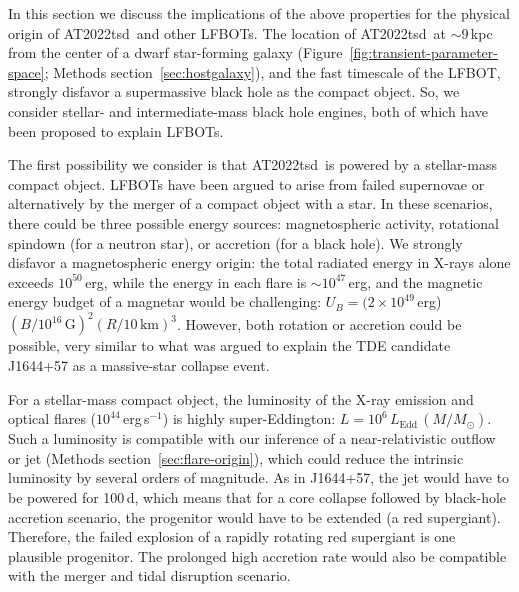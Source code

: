 \documentclass{nature_plusfigure}
\newcommand{\at}{AT2022tsd}
\begin{document}
\begin{methods}
In this section we discuss the implications of the above properties for the physical origin of \at\ and other LFBOTs. The location of \at\ at $\sim9\,$kpc from the center of a dwarf star-forming galaxy (Figure~\ref{fig:transient-parameter-space}; Methods section~\ref{sec:hostgalaxy}), and the fast timescale of the LFBOT, strongly disfavor a supermassive black hole as the compact object. So, we consider stellar- and intermediate-mass black hole engines, both of which have been proposed to explain LFBOTs\cite{Perley2019,Margutti2019,Metzger2022,Chen2023}. 

The first possibility we consider is that \at\ is powered by a stellar-mass compact object. LFBOTs have been argued to arise from failed supernovae\cite{Perley2019,Margutti2019} or alternatively by the merger of a compact object with a star\cite{Metzger2022}. In these scenarios, there could be three possible energy sources: magnetospheric activity, rotational spindown (for a neutron star), or accretion (for a black hole). We strongly disfavor a magnetospheric energy origin: the total radiated energy in X-rays alone exceeds $10^{50}\,$erg, while the energy in each flare is $\sim10^{47}\,$erg, and the magnetic energy budget of a magnetar would be challenging: $U_B = (2\times10^{49}\,$erg)$(B/10^{16}\,\mathrm{G})^2 (R/10\,\mathrm{km})^3$. However, both rotation or accretion could be possible, very similar to what was argued to explain the TDE candidate J1644+57 as a massive-star collapse event\cite{Quataert2012}. 

For a stellar-mass compact object, the luminosity of the X-ray emission and optical flares ($10^{44}\,$erg\,s$^{-1}$) is highly super-Eddington: $L=10^{6}\,L_\mathrm{Edd}\,(M/M_\odot)$. Such a luminosity is compatible with our inference of a near-relativistic outflow or jet (Methods section~\ref{sec:flare-origin}), which could reduce the intrinsic luminosity by several orders of magnitude. As in J1644+57, the jet would have to be powered for 100\,d, which means that for a core collapse followed by black-hole accretion scenario\cite{Woosley1993,WoosleyHeger2012,Kashiyama2015}, the progenitor would have to be extended (a red supergiant\cite{Quataert2012}). Therefore, the failed explosion of a rapidly rotating red supergiant is one plausible progenitor. The prolonged high accretion rate would also be compatible with the merger and tidal disruption scenario\cite{Metzger2022}.


\end{methods}
\end{document}
